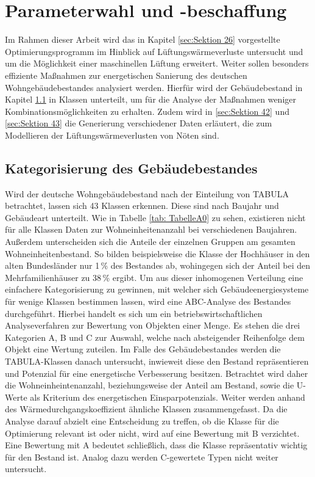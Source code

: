 \chapter{Parameterwahl und -beschaffung}

Im Rahmen dieser Arbeit wird das in Kapitel \ref{sec:Sektion 26} vorgestellte Optimierungsprogramm im Hinblick auf Lüftungswärmeverluste untersucht und um die Möglichkeit einer maschinellen Lüftung erweitert.
Weiter sollen besonders effiziente Maßnahmen zur energetischen Sanierung des deutschen Wohngebäudebestandes analysiert werden.
Hierfür wird der Gebäudebestand in Kapitel \ref{sec:Sektion 41} in Klassen unterteilt, um für die Analyse der Maßnahmen weniger Kombinationsmöglichkeiten zu erhalten.
Zudem wird in \ref{sec:Sektion 42} und \ref{sec:Sektion 43} die Generierung verschiedener Daten erläutert, die zum Modellieren der Lüftungswärmeverlusten von Nöten sind.

\section{Kategorisierung des Gebäudebestandes}
\label{sec:Sektion 41}

Wird der deutsche Wohngebäudebestand nach der Einteilung von TABULA betrachtet, lassen sich 43 Klassen erkennen.
Diese sind nach Baujahr und Gebäudeart unterteilt.
Wie in Tabelle \ref{tab: TabelleA0} zu sehen, existieren nicht für alle Klassen Daten zur Wohneinheitenanzahl bei verschiedenen Baujahren.
Außerdem unterscheiden sich die Anteile der einzelnen Gruppen am gesamten Wohneinheitenbestand.
So bilden beispielsweise die Klasse der Hochhäuser in den alten Bundesländer nur 1\,\% des Bestandes ab, wohingegen sich der Anteil bei den Mehrfamilienhäuser zu 38\,\% ergibt.
Um aus dieser inhomogenen Verteilung eine einfachere Kategorisierung zu gewinnen, mit welcher sich Gebäudeenergiesysteme für wenige Klassen bestimmen lassen, wird eine ABC-Analyse des Bestandes durchgeführt.
Hierbei handelt es sich um ein betriebswirtschaftlichen Analyseverfahren zur Bewertung von Objekten einer Menge.
Es stehen die drei Kategorien A, B und C zur Auswahl, welche nach absteigender Reihenfolge dem Objekt eine Wertung zuteilen.
Im Falle des Gebäudebestandes werden die TABULA-Klassen danach untersucht, inwieweit diese den Bestand repräsentieren und Potenzial für eine energetische Verbesserung besitzen.
Betrachtet wird daher die Wohneinheintenanzahl, beziehungsweise der Anteil am Bestand, sowie die U-Werte als Kriterium des energetischen Einsparpotenzials.
Weiter werden anhand des Wärmedurchgangskoeffizient ähnliche Klassen zusammengefasst.
Da die Analyse darauf abzielt eine Entscheidung zu treffen, ob die Klasse für die Optimierung relevant ist oder nicht, wird auf eine Bewertung mit B verzichtet.
Eine Bewertung mit A bedeutet schließlich, dass die Klasse repräsentativ wichtig für den Bestand ist.
Analog dazu werden C-gewertete Typen nicht weiter untersucht.

